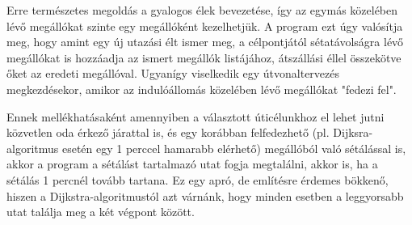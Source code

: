 Erre természetes megoldás a gyalogos élek bevezetése, így az egymás közelében lévő megállókat szinte egy megállóként kezelhetjük. A program ezt úgy valósítja meg, hogy amint egy új utazási élt ismer meg, a célpontjától sétatávolságra lévő megállókat is hozzáadja az ismert megállók listájához, átszállási éllel összekötve őket az eredeti megállóval. Ugyanígy viselkedik egy útvonaltervezés megkezdésekor, amikor az indulóállomás közelében lévő megállókat "fedezi fel".

Ennek mellékhatásaként amennyiben a választott úticélunkhoz el lehet jutni közvetlen oda érkező járattal is, és egy korábban felfedezhető (pl. Dijksra-algoritmus esetén egy 1 perccel hamarabb elérhető) megállóból való sétálással is, akkor a program a sétálást tartalmazó utat fogja megtalálni, akkor is, ha a sétálás 1 percnél tovább tartana. Ez egy apró, de említésre érdemes bökkenő, hiszen a Dijkstra-algoritmustól azt várnánk, hogy minden esetben a leggyorsabb utat találja meg a két végpont között.

